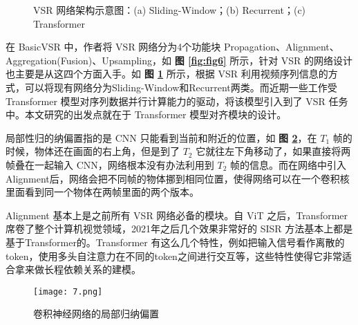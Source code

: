 \begin{figure}[!htbp]
\vspace{-5mm}
  \centering
  \begin{minipage}[b]{\linewidth} 
  \hspace{5mm}
   \hspace{5mm}
      \end{minipage}
  \caption{VSR 网络架构示意图：(a) Sliding-Window；(b) Recurrent；(c) Transformer}
  \label{fig:fig5}
\end{figure}

在 BasicVSR 中，作者将 VSR 网络分为4个功能块 Propagation、Alignment、Aggregation(Fusion)、Upsampling，如 \textbf{图 \ref{fig:fig6}} 所示，针对 VSR 的网络设计也主要是从这四个方面入手。如 \textbf{图 \ref{fig:fig5}} 所示，根据 VSR 利用视频序列信息的方式，可以将现有网络分为Sliding-Window和Recurrent两类。而近期一些工作受 Transformer 模型对序列数据并行计算能力的驱动，将该模型引入到了 VSR 任务中。本文研究的出发点就在于 Transformer 模型对齐模块的设计。

局部性归的纳偏置指的是 CNN 只能看到当前和附近的位置，如 \textbf{图 \ref{fig:fig7}}，在 $T_1$ 帧的时候，物体还在画面的右上角，但是到了 $T_2$ 它就往左下角移动了，如果直接将两帧叠在一起输入 CNN，网络根本没有办法利用到 $T_2$ 帧的信息。而在网络中引入 Alignment后，网络会把不同帧的物体挪到相同位置，使得网络可以在一个卷积核里面看到同一个物体在两帧里面的两个版本。

Alignment 基本上是之前所有 VSR 网络必备的模块。自 ViT 之后，Transformer 席卷了整个计算机视觉领域，2021年之后几个效果非常好的 SISR 方法基本上都是基于Transformer的。Transformer 有这么几个特性，例如把输入信号看作离散的token，使用多头自注意力在不同的token之间进行交互等，这些特性使得它非常适合拿来做长程依赖关系的建模。

\begin{figure}[!tbp]
\centering
\texttt{[image: 7.png]}	
\caption{卷积神经网络的局部归纳偏置}
\label{fig:fig7}
\end{figure}

